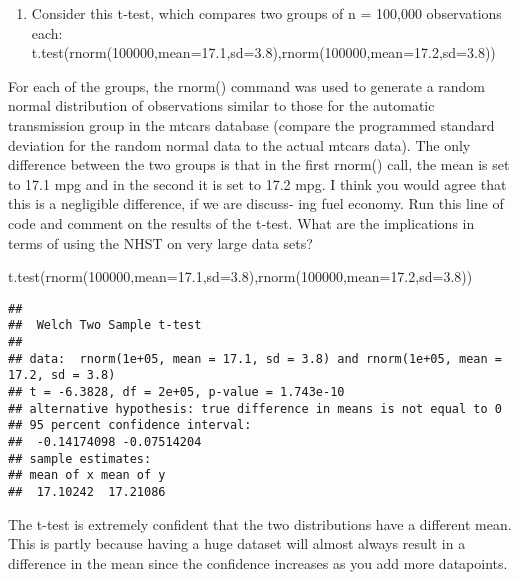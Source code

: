 \documentclass[
]{article}
\newenvironment{Shaded}{\begin{snugshade}}{\end{snugshade}}
\newcommand{\AttributeTok}[1]{\textcolor[rgb]{0.77,0.63,0.00}{#1}}
\newcommand{\DecValTok}[1]{\textcolor[rgb]{0.00,0.00,0.81}{#1}}
\newcommand{\FloatTok}[1]{\textcolor[rgb]{0.00,0.00,0.81}{#1}}
\newcommand{\FunctionTok}[1]{\textcolor[rgb]{0.00,0.00,0.00}{#1}}
\newcommand{\NormalTok}[1]{#1}
\providecommand{\tightlist}{%
  \setlength{\itemsep}{0pt}\setlength{\parskip}{0pt}}
\begin{document}
\begin{enumerate}
\def\labelenumi{\arabic{enumi}.}
\setcounter{enumi}{9}
\tightlist
\item
  Consider this t‐test, which compares two groups of n = 100,000
  observations each:
  t.test(rnorm(100000,mean=17.1,sd=3.8),rnorm(100000,mean=17.2,sd=3.8))
\end{enumerate}

For each of the groups, the rnorm() command was used to generate a
random normal distribution of observations similar to those for the
automatic transmission group in the mtcars database (compare the
programmed standard deviation for the random normal data to the actual
mtcars data). The only difference between the two groups is that in the
first rnorm() call, the mean is set to 17.1 mpg and in the second it is
set to 17.2 mpg. I think you would agree that this is a negligible
difference, if we are discuss‐ ing fuel economy. Run this line of code
and comment on the results of the t‐test. What are the implications in
terms of using the NHST on very large data sets?

\begin{Shaded}
\begin{Highlighting}[]
\FunctionTok{t.test}\NormalTok{(}\FunctionTok{rnorm}\NormalTok{(}\DecValTok{100000}\NormalTok{,}\AttributeTok{mean=}\FloatTok{17.1}\NormalTok{,}\AttributeTok{sd=}\FloatTok{3.8}\NormalTok{),}\FunctionTok{rnorm}\NormalTok{(}\DecValTok{100000}\NormalTok{,}\AttributeTok{mean=}\FloatTok{17.2}\NormalTok{,}\AttributeTok{sd=}\FloatTok{3.8}\NormalTok{))}
\end{Highlighting}
\end{Shaded}

\begin{verbatim}
## 
##  Welch Two Sample t-test
## 
## data:  rnorm(1e+05, mean = 17.1, sd = 3.8) and rnorm(1e+05, mean = 17.2, sd = 3.8)
## t = -6.3828, df = 2e+05, p-value = 1.743e-10
## alternative hypothesis: true difference in means is not equal to 0
## 95 percent confidence interval:
##  -0.14174098 -0.07514204
## sample estimates:
## mean of x mean of y 
##  17.10242  17.21086
\end{verbatim}

The t-test is extremely confident that the two distributions have a
different mean. This is partly because having a huge dataset will almost
always result in a difference in the mean since the confidence increases
as you add more datapoints.
\end{document}
